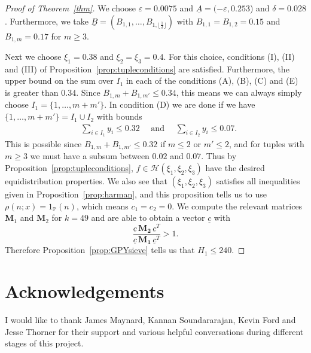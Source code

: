\documentclass{amsart}
\numberwithin{equation}{section}
\begin{document}
\begin{proof}[Proof of Theorem~\ref{thm}]
We choose $\varepsilon =  0.0075
$ and  $\underline{A} = (-\varepsilon, 0.253$) and $\delta = 0.028$.  Furthermore, we take $\underline{B} = (B_{1,1}, \dots, B_{1, \lfloor \frac{1}{\delta} \rfloor})$ with $B_{1,1}=B_{1,2} = 0.15$ and $B_{1,m} = 0.17$ for $m \geq 3$.

\medskip Next  we choose $\xi_1= 0.38 $  and $\xi_2=\xi_3= 0.4$. For this choice, conditions (I), (II) and (III) of Proposition~\ref{prop:tupleconditions} are satisfied. Furthermore, the upper bound on the sum over $I_1$ in each of the conditions (A), (B), (C) and (E) is greater than $0.34$. Since $B_{1,m}+B_{1,m'} \leq 0.34$, this means we can always simply choose $I_1 = \{1, \dots, m+m'\}$. In condition (D) we are done if we have $ \{1, \dots, m+m'\} = I_1 \cup I_2$ with bounds
\begin{align*}
&\sum_{i \in I_1} y_i \leq  0.32 \quad  \mbox{ and } \quad 
   \sum_{i \in I_2} y_i \leq  0.07.
\end{align*} 
 This is possible since $B_{1,m}+ B_{1,m'} \leq 0.32$ if $m\leq 2$ or $m' \leq 2$, and for tuples with $m\geq 3$ we must have a subsum between $0.02$ and $0.07$. Thus  by Proposition~\ref{prop:tupleconditions},  $f \in \mathcal{H}(\xi_1,\xi_2,\xi_3)$ have the desired equidistribution properties.   We also see that $(\xi_1,\xi_2,\xi_3)$ satisfies all   inequalities given in Proposition~\ref{prop:harman}, and this proposition tells us to use $\rho(n;x)=1_{\mathbb{P}}(n)$, which means $c_1=c_2=0$. We compute the relevant matrices $\mathbf{M}_1$ and $\mathbf{M}_2$ for $k=49$ and are able to obtain a vector $\underline{c}$ with 
  $$\frac{\underline{c} \, \mathbf{M_2} \,  \underline{c}^T}{\underline{c} \, \mathbf{M_1} \, \underline{c}^T}>1.$$
  Therefore  Proposition~\ref{prop:GPYsieve} tells us that $H_1 \leq 240$.
\end{proof}

  


\section*{Acknowledgements}

I would like to thank James Maynard,    Kannan Soundararajan, Kevin Ford and Jesse Thorner for their support and various helpful conversations  during different stages of this project. 


 
\end{document}

